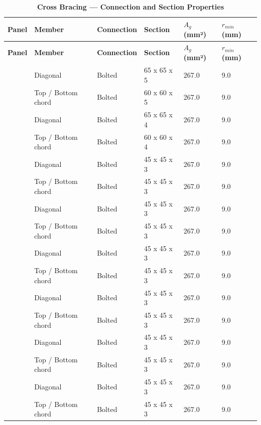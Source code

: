 \documentclass[12pt,a4paper]{report}
\numberwithin{table}{chapter}
\numberwithin{figure}{chapter}
\begin{document}
\vspace{1em}

\vspace{0.4em}
\noindent
\setlength{\tabcolsep}{4pt}
\setlength\LTleft{0pt}
\setlength\LTright{\fill}

\begin{longtable}{|C{2.0cm}|L{2.0cm}|L{2.2cm}|C{2.5cm}|C{2.0cm}|C{2.0cm}|}
\caption{\textbf{Cross Bracing --- Connection and Section Properties}}\\
\hline
\textbf{Panel} & \textbf{Member} & \textbf{Connection} & \textbf{Section} & \textbf{$A_g$ (mm²)} & \textbf{$r_{min}$ (mm)} \\[6pt]
\hline
\endfirsthead
\hline
\textbf{Panel} & \textbf{Member} & \textbf{Connection} & \textbf{Section} & \textbf{$A_g$ (mm²)} & \textbf{$r_{min}$ (mm)} \\[6pt]
\hline
\endhead
{} & Diagonal & Bolted & 65 x 65 x 5 & 267.0 & 9.0 \\[6pt]
 & Top / Bottom chord & Bolted & 60 x 60 x 5 & 267.0 & 9.0 \\[6pt]
\hline
{} & Diagonal & Bolted & 65 x 65 x 4 & 267.0 & 9.0 \\[6pt]
 & Top / Bottom chord & Bolted & 60 x 60 x 4 & 267.0 & 9.0 \\[6pt]
\hline
{} & Diagonal & Bolted & 45 x 45 x 3 & 267.0 & 9.0 \\[6pt]
 & Top / Bottom chord & Bolted & 45 x 45 x 3 & 267.0 & 9.0 \\[6pt]
\hline
{} & Diagonal & Bolted & 45 x 45 x 3 & 267.0 & 9.0 \\[6pt]
 & Top / Bottom chord & Bolted & 45 x 45 x 3 & 267.0 & 9.0 \\[6pt]
\hline
{} & Diagonal & Bolted & 45 x 45 x 3 & 267.0 & 9.0 \\[6pt]
 & Top / Bottom chord & Bolted & 45 x 45 x 3 & 267.0 & 9.0 \\[6pt]
\hline
{} & Diagonal & Bolted & 45 x 45 x 3 & 267.0 & 9.0 \\[6pt]
 & Top / Bottom chord & Bolted & 45 x 45 x 3 & 267.0 & 9.0 \\[6pt]
\hline
{} & Diagonal & Bolted & 45 x 45 x 3 & 267.0 & 9.0 \\[6pt]
 & Top / Bottom chord & Bolted & 45 x 45 x 3 & 267.0 & 9.0 \\[6pt]
\hline
{} & Diagonal & Bolted & 45 x 45 x 3 & 267.0 & 9.0 \\[6pt]
 & Top / Bottom chord & Bolted & 45 x 45 x 3 & 267.0 & 9.0 \\[6pt]
\hline
\end{longtable}
\end{document}
